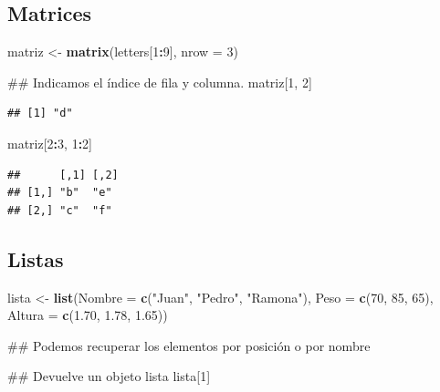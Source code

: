 \documentclass[spanish,]{book}
\newenvironment{Shaded}{\begin{snugshade}}{\end{snugshade}}
\newcommand{\KeywordTok}[1]{\textcolor[rgb]{0.13,0.29,0.53}{\textbf{#1}}}
\newcommand{\DataTypeTok}[1]{\textcolor[rgb]{0.13,0.29,0.53}{#1}}
\newcommand{\DecValTok}[1]{\textcolor[rgb]{0.00,0.00,0.81}{#1}}
\newcommand{\FloatTok}[1]{\textcolor[rgb]{0.00,0.00,0.81}{#1}}
\newcommand{\StringTok}[1]{\textcolor[rgb]{0.31,0.60,0.02}{#1}}
\newcommand{\OperatorTok}[1]{\textcolor[rgb]{0.81,0.36,0.00}{\textbf{#1}}}
\newcommand{\NormalTok}[1]{#1}
\begin{document}
\subsection{Matrices}\label{matrices-1}

\begin{Shaded}
\begin{Highlighting}[]
\NormalTok{matriz <-}\StringTok{ }\KeywordTok{matrix}\NormalTok{(letters[}\DecValTok{1}\OperatorTok{:}\DecValTok{9}\NormalTok{], }\DataTypeTok{nrow =} \DecValTok{3}\NormalTok{)}

\NormalTok{## Indicamos el índice de fila y columna.}
\NormalTok{matriz[}\DecValTok{1}\NormalTok{, }\DecValTok{2}\NormalTok{]}
\end{Highlighting}
\end{Shaded}

\begin{verbatim}
## [1] "d"
\end{verbatim}

\begin{Shaded}
\begin{Highlighting}[]
\NormalTok{matriz[}\DecValTok{2}\OperatorTok{:}\DecValTok{3}\NormalTok{, }\DecValTok{1}\OperatorTok{:}\DecValTok{2}\NormalTok{]}
\end{Highlighting}
\end{Shaded}

\begin{verbatim}
##      [,1] [,2]
## [1,] "b"  "e" 
## [2,] "c"  "f"
\end{verbatim}

\subsection{Listas}\label{listas-1}

\begin{Shaded}
\begin{Highlighting}[]
\NormalTok{lista <-}\StringTok{ }\KeywordTok{list}\NormalTok{(}\DataTypeTok{Nombre =} \KeywordTok{c}\NormalTok{(}\StringTok{"Juan"}\NormalTok{, }\StringTok{"Pedro"}\NormalTok{, }\StringTok{"Ramona"}\NormalTok{),}
              \DataTypeTok{Peso =} \KeywordTok{c}\NormalTok{(}\DecValTok{70}\NormalTok{, }\DecValTok{85}\NormalTok{, }\DecValTok{65}\NormalTok{),}
              \DataTypeTok{Altura =} \KeywordTok{c}\NormalTok{(}\FloatTok{1.70}\NormalTok{, }\FloatTok{1.78}\NormalTok{, }\FloatTok{1.65}\NormalTok{))}


\NormalTok{## Podemos recuperar los elementos por posición o por nombre}

\NormalTok{## Devuelve un objeto lista}
\NormalTok{lista[}\DecValTok{1}\NormalTok{]}
\end{Highlighting}
\end{Shaded}
\end{document}
